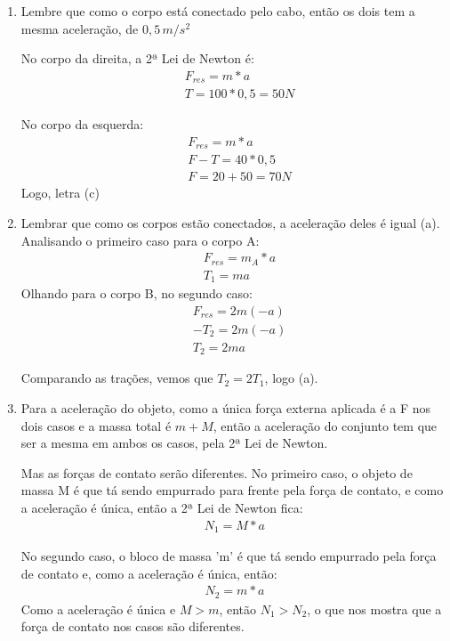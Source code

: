 \documentclass[12pt,letterpaper,fleqn]{article}
\begin{document}
\begin{itemize}
\begin{enumerate}
    \item Lembre que como o corpo está conectado pelo cabo, então os dois tem a mesma aceleração, de $0,5\,m/s^2$
    
    No corpo da direita, a 2ª Lei de Newton é:
    \begin{align*}
        &F_{res} = m*a\\
        &T = 100*0,5 = 50 N
    \end{align*}
    
    No corpo da esquerda:
    \begin{align*}
        &F_{res} = m*a\\
        & F - T = 40*0,5\\
        &F = 20 + 50 = 70 N
    \end{align*}
    Logo, letra (c)
    
    \item Lembrar que como os corpos estão conectados, a aceleração deles é igual (a). Analisando o primeiro caso para o corpo A:
    \begin{align*}
        &F_{res} = m_A*a \\
        &T_1 = ma
    \end{align*}
    Olhando para o corpo B, no segundo caso:
    \begin{align*}
        &F_{res} = 2m(-a)\\
        &-T_2 = 2m(-a)\\
        &T_2= 2ma
    \end{align*}

    Comparando as trações, vemos que $T_2 = 2T_1$, logo (a).
    
    \item Para a aceleração do objeto, como a única força externa aplicada é a F nos dois casos e a massa total é $m+M$, então a aceleração do conjunto tem que ser a mesma em ambos os casos, pela 2ª Lei de Newton.
    
    Mas as forças de contato serão diferentes. No primeiro caso, o objeto de massa M é que tá sendo empurrado para frente pela força de contato, e como a aceleração é única, então a 2ª Lei de Newton fica:
    \begin{align*}
        N_1 = M*a
    \end{align*}
    
    No segundo caso, o bloco de massa 'm' é que tá sendo empurrado pela força de contato e, como a aceleração é única, então:
    \begin{align*}
        N_2 = m*a
    \end{align*}
    Como a aceleração é única e $M>m$, então $N_1>N_2$, o que nos mostra que a força de contato nos casos são diferentes.
\end{enumerate}


\end{itemize}
\end{document}
